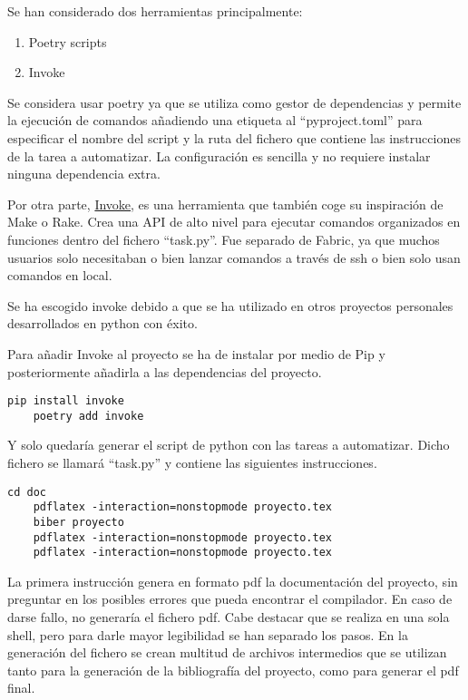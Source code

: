 Se han considerado dos herramientas principalmente: 
\begin{enumerate}
	\item Poetry scripts
	\item Invoke
\end{enumerate}

Se considera usar \gls{poetry} ya que se utiliza como gestor de dependencias y permite la ejecución de comandos añadiendo una etiqueta al ``pyproject.toml'' para especificar el nombre del script y la ruta del fichero que contiene las instrucciones de la tarea a automatizar. La configuración es sencilla y no requiere instalar ninguna dependencia extra.

Por otra parte, \href{https://www.pyinvoke.org/}{Invoke}, es una herramienta que también coge su inspiración de Make o Rake. Crea una \gls{API} de alto nivel para ejecutar comandos organizados en funciones dentro del fichero ``task.py''. Fue separado de Fabric, ya que muchos usuarios solo necesitaban o bien lanzar comandos a través de ssh o bien solo usan comandos en local. 

Se ha escogido \Gls{invoke} debido a que se ha utilizado en otros proyectos personales desarrollados en \Gls{python} con éxito.

Para añadir Invoke al proyecto se ha de instalar por medio de Pip y posteriormente añadirla a las \glspl{dependencia} del proyecto.
\begin{lstlisting}[style=consola]
	pip install invoke
	poetry add invoke
\end{lstlisting}

Y solo quedaría generar el \gls{script} de python con las tareas a automatizar. Dicho fichero se llamará ``task.py'' y contiene las siguientes instrucciones. 

\begin{lstlisting}[style=consola]
	cd doc
	pdflatex -interaction=nonstopmode proyecto.tex
	biber proyecto
	pdflatex -interaction=nonstopmode proyecto.tex
	pdflatex -interaction=nonstopmode proyecto.tex
\end{lstlisting}
La primera instrucción genera en formato pdf la documentación del proyecto, sin preguntar en los posibles errores que pueda encontrar el compilador. En caso de darse fallo, no generaría el fichero pdf. Cabe destacar que se realiza en una sola \gls{shell}, pero para darle mayor legibilidad se han separado los pasos. En la generación del fichero se crean multitud de archivos intermedios que se utilizan tanto para la generación de la bibliografía del proyecto, como para generar el pdf final. 

